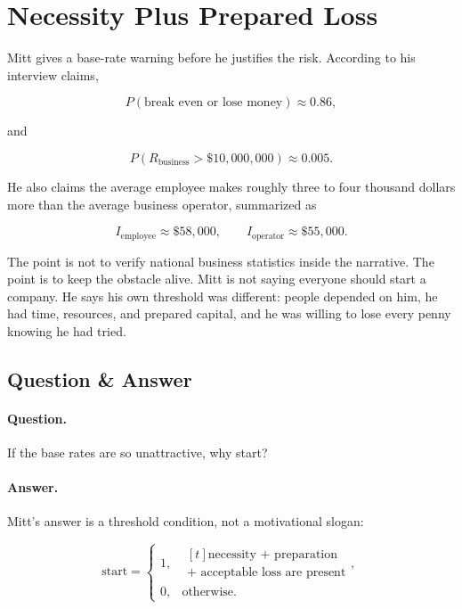 \documentclass[11pt,oneside]{book}
\begin{document}
\section{Necessity Plus Prepared Loss}

Mitt gives a base-rate warning before he justifies the risk. According to his interview claims,

\begin{equation}
P(\text{break even or lose money})\approx 0.86,
\end{equation}

and

\begin{equation}
P(R_{\mathrm{business}}>\$10{,}000{,}000)\approx 0.005.
\end{equation}

He also claims the average employee makes roughly three to four thousand dollars more than the average business operator, summarized as

\begin{equation}
I_{\mathrm{employee}}\approx \$58{,}000,\qquad
I_{\mathrm{operator}}\approx \$55{,}000.
\end{equation}

The point is not to verify national business statistics inside the narrative. The point is to keep the obstacle alive. Mitt is not saying everyone should start a company. He says his own threshold was different: people depended on him, he had time, resources, and prepared capital, and he was willing to lose every penny knowing he had tried.

\subsection{Question \& Answer}

\paragraph{Question.}
If the base rates are so unattractive, why start?

\paragraph{Answer.}
Mitt's answer is a threshold condition, not a motivational slogan:

\begin{equation}
\text{start}
=
\begin{cases}
1, & \begin{aligned}[t]\text{necessity + preparation}\\\text{+ acceptable loss are present}\end{aligned},\\
0, & \text{otherwise}.
\end{cases}
\end{equation}
\end{document}

